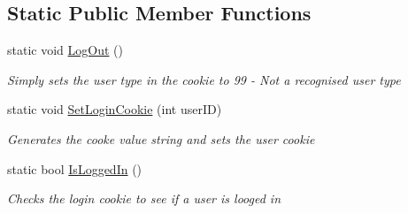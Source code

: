 \subsection*{Static Public Member Functions}
\begin{DoxyCompactItemize}
\item 
static void \hyperlink{class_uni_enrollment___m_v_c_1_1_helpers_1_1_cookie_helper_a8d89858ce1ad57300dba697b3e025786}{Log\+Out} ()
\begin{DoxyCompactList}\small\item\em Simply sets the user type in the cookie to \textquotesingle{}99\textquotesingle{} -\/ Not a recognised user type \end{DoxyCompactList}\item 
static void \hyperlink{class_uni_enrollment___m_v_c_1_1_helpers_1_1_cookie_helper_a721083f9d6d893479224691ed474cadd}{Set\+Login\+Cookie} (int user\+ID)
\begin{DoxyCompactList}\small\item\em Generates the cooke value string and sets the user cookie \end{DoxyCompactList}\item 
static bool \hyperlink{class_uni_enrollment___m_v_c_1_1_helpers_1_1_cookie_helper_a5246ce649993e4489954be79b6ff81c1}{Is\+Logged\+In} ()
\begin{DoxyCompactList}\small\item\em Checks the login cookie to see if a user is looged in \end{DoxyCompactList}\end{DoxyCompactItemize}
